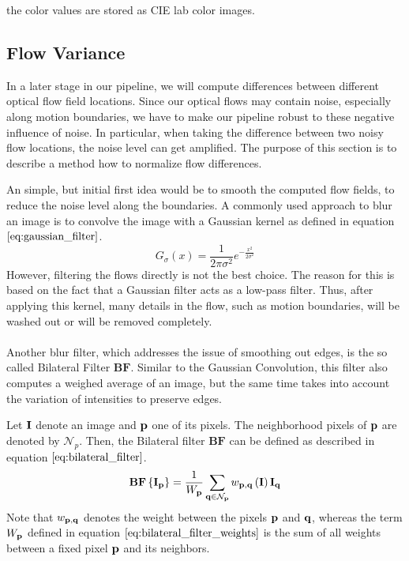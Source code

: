 the color values are stored as CIE lab color images.

\subsection{Flow Variance}

In a later stage in our pipeline, we will compute differences between different optical flow field locations. Since our optical flows may contain noise, especially along motion boundaries, we have to make our pipeline robust to these negative influence of noise. In particular, when taking the difference between two noisy flow locations, the noise level can get amplified. The purpose of this section is to describe a method how to normalize flow differences. 

An simple, but initial first idea would be to smooth the computed flow fields, to reduce the noise level along the boundaries. A commonly used approach to blur an image is to convolve the image with a Gaussian kernel as defined in equation $\ref{eq:gaussian_filter}$.
\begin{equation}
	G_{\sigma}\left( x \right) = \frac{1}{2 \pi \sigma^2} e^{-\frac{x^2}{2 \sigma^2}}
\label{eq:gaussian_filter}
\end{equation}
However, filtering the flows directly is not the best choice. The reason for this is based on the fact that a Gaussian filter acts as a low-pass filter. Thus, after applying this kernel, many details in the flow, such as motion boundaries, will be washed out or will be removed completely. \\ \\
Another blur filter, which addresses the issue of smoothing out edges, is the so called Bilateral Filter $\textbf{BF}$. Similar to the Gaussian Convolution, this filter also computes a weighed average of an image, but the same time takes into account the variation of intensities to preserve edges. 

Let $\bf{I}$ denote an image and $\bf{p}$ one of its pixels. The neighborhood pixels of $\bf{p}$ are denoted by $\mathcal{N}_p$. Then, the Bilateral filter $\textbf{BF}$ can be defined as described in equation $\ref{eq:bilateral_filter}$.
\begin{equation}
	\textbf{BF} \left\{ \bf{I}_{\bf{p}} \right\} = \frac{1}{W_{\bf{p}}} \sum_{\bf{q} \in \mathcal{N}_p} w_{\bf{p}, \bf{q}} \left( \bf{I} \right) \bf{I}_{\bf{q}}
\label{eq:bilateral_filter}
\end{equation}
Note that $w_{\bf{p}, \bf{q}}$ denotes the weight between the pixels $\bf{p}$ and $\bf{q}$, whereas the term $W_{\bf{p}}$ defined in equation $\ref{eq:bilateral_filter_weights}$ is the sum of all weights between a fixed pixel $\bf{p}$ and its neighbors.

